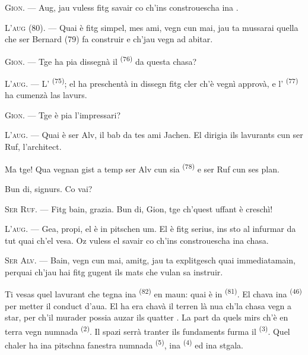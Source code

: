 \VUsaut{6.0mm}
\VUsaut{1.4mm}
\VUsaut{2.2mm}

\VUsaut{3.0mm}

\textsc{Gion}. --- Aug, jau vuless fitg savair co ch'ins constrouescha ina
.

\textsc{L'aug} (80). --- Quai è fitg simpel, mes ami, vegn cun mai, jau ta mussarai
quella che ser Bernard (79) fa construir e ch'jau vegn ad abitar.

\textsc{Gion}. --- Tge ha pia dissegnà il  \textsuperscript{(76)} da questa
chasa?

\textsc{L'aug}. --- L' \textsuperscript{(75)}; el ha preschentà in
dissegn fitg cler ch'è vegnì approvà, e l'
\textsuperscript{(77)} ha cumenzà las lavurs.

\textsc{Gion}. --- Tge è pia l'impressari?

\textsc{L'aug}. --- Quai è ser Alv, il bab da tes ami Jachen. El dirigia ils
lavurants cun ser Ruf, l'architect.

Ma tge! Qua vegnan gist a temp ser Alv cun sia  \textsuperscript{(78)} e ser
Ruf cun ses plan.

Bun di, signurs. Co vai?

\textsc{Ser Ruf}. --- Fitg bain, grazia. Bun di, Gion, tge ch'quest uffant è
creschì!

\textsc{L'aug}. --- Gea, propi, el è in pitschen um. El è fitg serius, ins sto al
infurmar da tut quai ch'el vesa. Oz vuless el savair co ch'ins constrouescha ina
chasa.

\VUsaut{3.0mm}

\textsc{Ser Alv}. --- Bain, vegn cun mai, amitg, jau ta explitgesch quai
immediatamain, perquai ch'jau hai fitg gugent ils mats che vulan sa instruir.

Ti vesas quel lavurant che tegna ina  \textsuperscript{(82)} en maun: quai è in
 \textsuperscript{(81)}. El chava ina 
\textsuperscript{(46)} per metter il conduct d'aua. El ha era chavà il terren là
nua ch'la chasa vegn a star, per ch'il murader possia auzar ils quatter
. La part da quels mirs ch'è en terra vegn numnada
 \textsuperscript{(2)}. Il spazi serrà tranter ils fundaments furma
il  \textsuperscript{(3)}. Quel chaler ha ina pitschna fanestra numnada
 \textsuperscript{(5)}, ina 
\textsuperscript{(4)} ed ina stgala.

